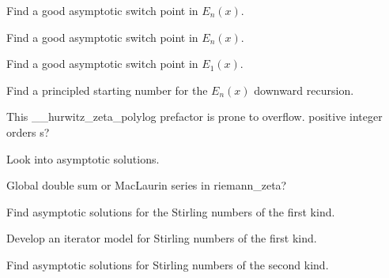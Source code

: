 \begin{DoxyRefList}
Find a good asymptotic switch point in $ E_n(x) $. 

Find a good asymptotic switch point in $ E_n(x) $.  
\item[\label{todo__todo000010}%
\hypertarget{todo__todo000010}{}%
Member \hyperlink{namespacestd_1_1____detail_a665eb0c524b929c035d88bbb17815917}{std\+:\+:\+\_\+\+\_\+detail\+:\+:\+\_\+\+\_\+expint\+\_\+\+E1} (\+\_\+\+Tp \+\_\+\+\_\+x)]Find a good asymptotic switch point in $ E_1(x) $.  
\item[\label{todo__todo000009}%
\hypertarget{todo__todo000009}{}%
Member \hyperlink{namespacestd_1_1____detail_a9b0a2050324390fb6c4a584170289a99}{std\+:\+:\+\_\+\+\_\+detail\+:\+:\+\_\+\+\_\+expint\+\_\+\+En\+\_\+recursion} (unsigned int \+\_\+\+\_\+n, \+\_\+\+Tp \+\_\+\+\_\+x)]Find a principled starting number for the $ E_n(x) $ downward recursion.  
\item[\label{todo__todo000013}%
\hypertarget{todo__todo000013}{}%
Member \hyperlink{namespacestd_1_1____detail_a7c45415c3ec0e137eea2364a6dd3af4e}{std\+:\+:\+\_\+\+\_\+detail\+:\+:\+\_\+\+\_\+hurwitz\+\_\+zeta\+\_\+polylog} (\+\_\+\+Tp \+\_\+\+\_\+s, std\+::complex$<$ \+\_\+\+Tp $>$ \+\_\+\+\_\+a)]This \+\_\+\+\_\+hurwitz\+\_\+zeta\+\_\+polylog prefactor is prone to overflow. positive integer orders s?  
\item[\label{todo__todo000016}%
\hypertarget{todo__todo000016}{}%
Member \hyperlink{namespacestd_1_1____detail_a7ba1fde0547236676d579b6405f2fb25}{std\+:\+:\+\_\+\+\_\+detail\+:\+:\+\_\+\+\_\+log\+\_\+stirling\+\_\+2} (unsigned int \+\_\+\+\_\+n, unsigned int \+\_\+\+\_\+m)]Look into asymptotic solutions.  
\item[\label{todo__todo000018}%
\hypertarget{todo__todo000018}{}%
Member \hyperlink{namespacestd_1_1____detail_a2be77d9bdd1b8b463be44a0e7558bc2a}{std\+:\+:\+\_\+\+\_\+detail\+:\+:\+\_\+\+\_\+riemann\+\_\+zeta} (\+\_\+\+Tp \+\_\+\+\_\+s)]Global double sum or Mac\+Laurin series in riemann\+\_\+zeta?  
\item[\label{todo__todo000017}%
\hypertarget{todo__todo000017}{}%
Member \hyperlink{namespacestd_1_1____detail_a8b215e4ca28ec9b7b078d7f3d9aecc17}{std\+:\+:\+\_\+\+\_\+detail\+:\+:\+\_\+\+\_\+stirling\+\_\+1} (unsigned int \+\_\+\+\_\+n, unsigned int \+\_\+\+\_\+m)]Find asymptotic solutions for the Stirling numbers of the first kind. 

Develop an iterator model for Stirling numbers of the first kind.  
\item[\label{todo__todo000015}%
\hypertarget{todo__todo000015}{}%
Member \hyperlink{namespacestd_1_1____detail_a4589d459a7a9d1d9e19b33601238a4af}{std\+:\+:\+\_\+\+\_\+detail\+:\+:\+\_\+\+\_\+stirling\+\_\+2} (unsigned int \+\_\+\+\_\+n, unsigned int \+\_\+\+\_\+m)]Find asymptotic solutions for Stirling numbers of the second kind. 


\end{DoxyRefList}
